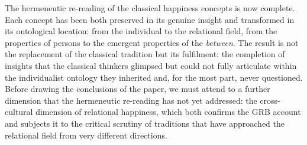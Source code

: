 The hermeneutic re-reading of the classical happiness concepts is now complete. Each concept has been both preserved in its genuine insight and transformed in its ontological location: from the individual to the relational field, from the properties of persons to the emergent properties of the \emph{between}. The result is not the replacement of the classical tradition but its fulfilment: the completion of insights that the classical thinkers glimpsed but could not fully articulate within the individualist ontology they inherited and, for the most part, never questioned. Before drawing the conclusions of the paper, we must attend to a further dimension that the hermeneutic re-reading has not yet addressed: the cross-cultural dimension of relational happiness, which both confirms the GRB account and subjects it to the critical scrutiny of traditions that have approached the relational field from very different directions.

